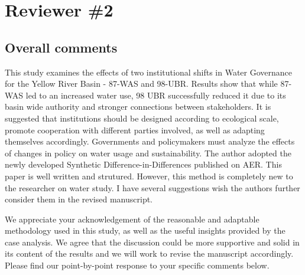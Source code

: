 \section{Reviewer \#2}\label{reviewer_2}

\subsection*{Overall comments}
\RC{} This study examines the effects of two institutional shifts in Water Governance for the Yellow River Basin - 87-WAS and 98-UBR. Results show that while 87-WAS led to an increased water use, 98 UBR successfully reduced it due to its basin wide authority and stronger connections between stakeholders. It is suggested that institutions should be designed according to ecological scale, promote cooperation with different parties involved, as well as adapting themselves accordingly. Governments and policymakers must analyze the effects of changes in policy on water usage and sustainability. The author adopted the newly developed Synthetic Difference-in-Differences published on AER. This paper is well written and strutured. However, this method is completely new to the researcher on water study. I have several suggestions wish the authors further consider them in the revised manuscript.

\AR{} We appreciate your acknowledgement of the reasonable and adaptable methodology used in this study, as well as the useful insights provided by the case analysis. We agree that the discussion could be more supportive and solid in its content of the results and we will work to revise the manuscript accordingly. Please find our point-by-point response to your specific comments below.

